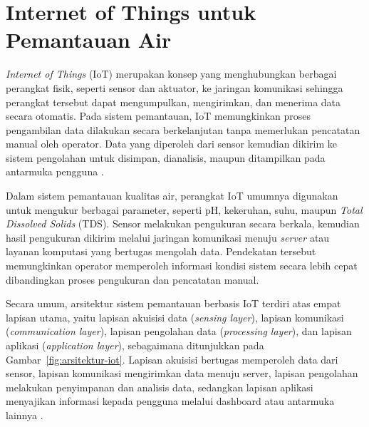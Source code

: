 \section{Internet of Things untuk Pemantauan Air}

\textit{Internet of Things} (IoT) merupakan konsep yang menghubungkan berbagai
perangkat fisik, seperti sensor dan aktuator, ke jaringan komunikasi sehingga
perangkat tersebut dapat mengumpulkan, mengirimkan, dan menerima data secara
otomatis. Pada sistem pemantauan, IoT memungkinkan proses pengambilan data
dilakukan secara berkelanjutan tanpa memerlukan pencatatan manual oleh operator.
Data yang diperoleh dari sensor kemudian dikirim ke sistem pengolahan untuk
disimpan, dianalisis, maupun ditampilkan pada antarmuka pengguna
\autocite{ismail2022iot}.

Dalam sistem pemantauan kualitas air, perangkat IoT umumnya digunakan untuk
mengukur berbagai parameter, seperti pH, kekeruhan, suhu, maupun
\textit{Total Dissolved Solids} (TDS). Sensor melakukan pengukuran secara
berkala, kemudian hasil pengukuran dikirim melalui jaringan komunikasi menuju
\textit{server} atau layanan komputasi yang bertugas mengolah data. Pendekatan tersebut
memungkinkan operator memperoleh informasi kondisi sistem secara lebih cepat
dibandingkan proses pengukuran dan pencatatan manual.

Secara umum, arsitektur sistem pemantauan berbasis IoT terdiri atas empat
lapisan utama, yaitu lapisan akuisisi data (\textit{sensing layer}), lapisan
komunikasi (\textit{communication layer}), lapisan pengolahan data
(\textit{processing layer}), dan lapisan aplikasi (\textit{application layer}),
sebagaimana ditunjukkan pada Gambar~\ref{fig:arsitektur-iot}. Lapisan akuisisi
bertugas memperoleh data dari sensor, lapisan komunikasi mengirimkan data
menuju server, lapisan pengolahan melakukan penyimpanan dan analisis data,
sedangkan lapisan aplikasi menyajikan informasi kepada pengguna melalui
dashboard atau antarmuka lainnya \autocite{ismail2022iot}.

